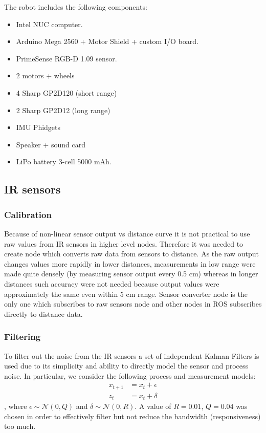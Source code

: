 The robot includes the following components:
\begin{itemize}
\item Intel NUC computer.
\item Arduino Mega 2560 + Motor Shield + custom I/O board.
\item PrimeSense RGB-D 1.09 sensor.
\item 2 motors + wheels
\item 4 Sharp GP2D120 (short range)
\item 2 Sharp GP2D12 (long range)
\item IMU Phidgets
\item Speaker + sound card
\item LiPo battery 3-cell 5000 mAh.
\end{itemize}

\subsection{IR sensors}
\subsubsection{Calibration}

Because of non-linear sensor output vs distance curve it is not practical to use raw values from IR sensors in higher level nodes. Therefore it was needed to create node which converts raw data from sensors to distance. As the raw output changes values more rapidly in lower distances, measurements in low range were made quite densely (by measuring sensor output every 0.5 cm) whereas in longer distances such accuracy were not needed because output values were approximately the same even within 5 cm range. Sensor converter node is the only one which subscribes to raw sensors node and other nodes in ROS subscribes directly to distance data.

\subsubsection{Filtering}

To filter out the noise from the IR sensors a set of independent Kalman Filters \cite{Thrun} is used due to its simplicity and ability to directly model the sensor and process noise. 
In particular, we consider the following process and measurement models:
\begin{align*}
x_{t+1} &= x_t + \epsilon \\
z_t &= x_t + \delta
\end{align*}
, where $\epsilon \sim \mathcal{N}(0,Q)$ and $\delta \sim \mathcal{N}(0,R)$. A value of $R = 0.01$, $Q = 0.04$ was chosen in order to effectively filter but not reduce the bandwidth (responsiveness) too much. 